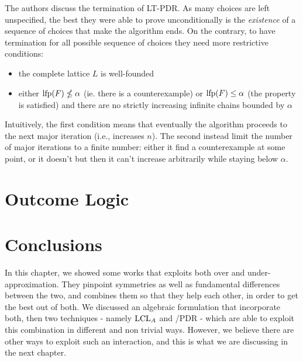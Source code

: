 The authors discuss the termination of LT-PDR. As many choices are left unspecified, the best they were able to prove unconditionally is the \emph{existence} of a sequence of choices that make the algorithm ends. On the contrary, to have termination for all possible sequence of choices they need more restrictive conditions:
\begin{itemize}
	\item the complete lattice $L$ is well-founded
	\item either $\text{lfp}(F) \nleq \alpha$ (ie. there is a counterexample) or $\text{lfp}(F) \le \alpha$ (the property is satisfied) and there are no strictly increasing infinite chains bounded by $\alpha$
\end{itemize}
Intuitively, the first condition means that eventually the algorithm proceeds to the next major iteration (i.e., increases $n$). The second instead limit the number of major iterations to a finite number: either it find a counterexample at some point, or it doesn't but then it can't increase arbitrarily while staying below $\alpha$.

\section{Outcome Logic}\label{sec:sota:ol}

\section{Conclusions}
In this chapter, we showed some works that exploits both over and under-approximation. They pinpoint symmetries as well as fundamental differences between the two, and combines them so that they help each other, in order to get the best out of both. We discussed an algebraic formulation that incorporate both, then two techniques - namely $\text{LCL}_A$ and /PDR - which are able to exploit this combination in different and non trivial ways. However, we believe there are other ways to exploit such an interaction, and this is what we are discussing in the next chapter.
